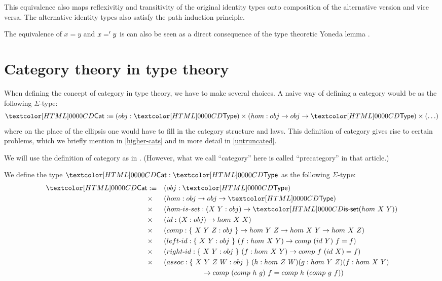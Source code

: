 This equivalence also maps reflexivitiy and transitivity of the
original identity types onto composition of the alternative version
and vice versa. The alternative identity types also satisfy the path
induction principle.

The equivalence of $x = y$ and $x =' y$ is can also be seen as a
direct consequence of the type theoretic Yoneda lemma
\cite{Rijke2012}.

\section{Category theory in type theory}

When defining the concept of category in type theory, we have to make
several choices. A naive way of defining a category would be as the
following $\Sigma$-type:
$$
\Cat \ddefeq (obj : \Type) \times (hom : obj \to obj \to \Type) \times (\hdots)
$$
where on the place of the ellipsis one would have to fill in the
category structure and laws. This definition of category gives rise to
certain problems, which we briefly mention in \cref{higher-cats} and
in more detail in \cref{untruncated}.

We will use the definition of category as in
\cite{Ahrens2015}. (However, what we call ``category'' here is called
``precategory'' in that article.)

\begin{definition}[Category]
  We define the type $\Cat : \Type$ as the following $\Sigma$-type:
  \begin{align*}
    \Cat &\ddefeq &&(obj : \Type) \\
         &\times &&(hom : obj \to obj \to \Type) \\
         &\times &&(\identalt{hom-is-set} : (X\ Y : obj) \to \isset (hom\ X\ Y)) \\
         &\times &&(id : (X : obj) \to hom\ X\ X) \\
         &\times &&(comp : \{\ X\ Y\ Z : obj\ \} \to hom\ Y\ Z \to hom\ X\ Y \to hom\ X\ Z) \\
         &\times &&(\identalt{left-id} : \{\ X\ Y : obj\ \}\ (f : hom\ X\ Y) \to comp\ (id\ Y)\ f = f) \\
         &\times &&(\identalt{right-id} : \{\ X\ Y : obj\ \}\ (f : hom\ X\ Y) \to comp\ f\ (id\ X) = f) \\
         &\times &&(assoc : \{\ X\ Y\ Z\ W : obj\ \}\ (h : hom\ Z\ W) (g : hom\ Y\ Z) (f : hom\ X\ Y) \\
         & &&\ \ \ \ \ \ \ \ \ \ \ \ \ \ \ \ \to comp\ (comp\ h\ g)\ f = comp\ h\ (comp\ g\ f))
  \end{align*}
\end{definition}

